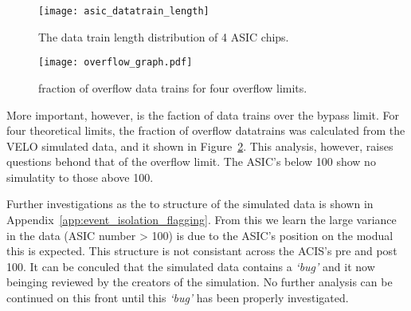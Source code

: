 		\begin{figure}[h]
			\centering
			\texttt{[image: asic\_datatrain\_length]}
			\caption{The data train length distribution of 4 ASIC chips.}
			\label{fig:asic_datatrain}
		\end{figure}
		\par
		\begin{figure}[h]
			\centering
			\texttt{[image: overflow\_graph.pdf]}
			\caption{fraction of overflow data trains for four overflow limits.}
			\label{fig:overflow_franction}
		\end{figure}
		More important, however, is the faction of data trains over the bypass limit.
		For four theoretical limits, the fraction of overflow datatrains was calculated from the VELO simulated data, and it shown in Figure~\ref{fig:overflow_franction}.
		This analysis, however, raises questions behond that of the overflow limit.
		The ASIC's below 100 show no simulatity to those above 100.
		\par
		Further investigations as the to structure of the simulated data is shown in Appendix~\ref{app:event_isolation_flagging}.
		From this we learn the large variance in the data (ASIC number > 100) is due to the ASIC's position on the modual this is expected.
		This structure is not consistant across the ACIS's pre and post 100.
		It can be conculed that the simulated data contains a \textit{`bug'} and it now beinging reviewed by the creators of the simulation. No further analysis can be continued on this front until this \textit{`bug'} has been properly investigated.


